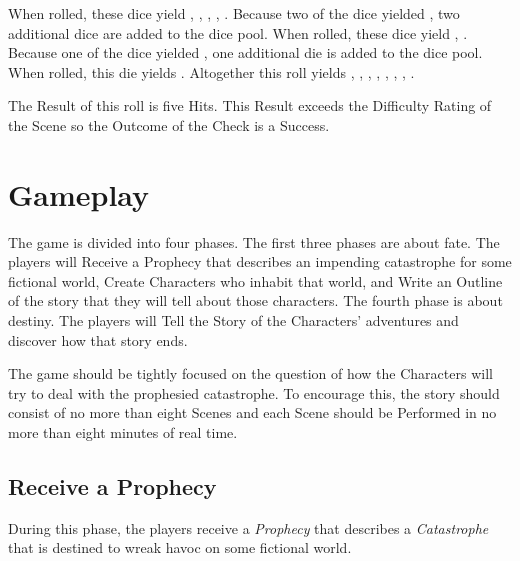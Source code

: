 \documentclass[12pt, a5paper, parskip=half-]{scrartcl}
\begin{document}
When rolled, these dice yield , , , ,  .%
Because two of the dice yielded , two additional dice are added to the dice pool.
When rolled, these dice yield , .%
Because one of the dice yielded , one additional die is added to the dice pool.
When rolled, this die yields .
Altogether this roll yields , , , , , , , .%

The Result of this roll is five Hits. This Result exceeds the Difficulty Rating of the Scene so the Outcome of the Check is a Success.   

\newpage

\section*{Gameplay}
The game is divided into four phases.
The first three phases are about fate.
The players will Receive a Prophecy that describes an impending catastrophe for some fictional world, Create Characters who inhabit that world, and Write an Outline of the story that they will tell about those characters.
The fourth phase is about destiny.
The players will Tell the Story of the Characters' adventures and discover how that story ends.

The game should be tightly focused on the question of how the Characters will try to deal with the prophesied catastrophe.
To encourage this, the story should consist of no more than eight Scenes and each Scene should be Performed in no more than eight minutes of real time. 

\subsection*{Receive a Prophecy}
During this phase, the players receive a \emph{Prophecy} that describes a \emph{Catastrophe} that is destined to wreak havoc on some fictional world.
\end{document}
